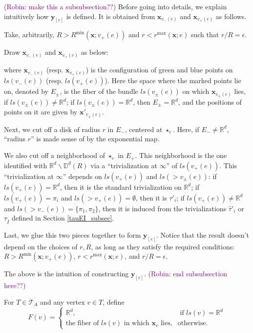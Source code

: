 \documentclass[11pt]{article}
\theoremstyle{definition}
\theoremstyle{remark}
\def\R{\mathbb{R}}
\def\D{\mathbb{D}}
\def\rI{{\mathring{I}}}
\def\bx{\mathbf{x}}
\def\by{\mathbf{y}}
\def\cmt#1{\textcolor{purple}{(#1)}}
\begin{document}
\cmt{Robin: make this a subsubsection??}
Before going into details, we explain intuitively how $\by_{[e]}$ is defined. It is obtained from $\bx_{v_-(e)}$ and $\bx_{v_+(e)}$ as follows.

Take, arbitrarily, $R>R^{\min}(\bx;v_+(e))$ and $r<r^{\max}(\bx;e)$ such that $r/R=\epsilon$. 

Draw $\bx_{v_-(e)}$ and $\bx_{v_+(e)}$ as below: 


where $\bx_{v_-(e)}$ (resp. $\bx_{v_+(e)}$) is the configuration of green and blue points on $ls(v_-(e))$ (resp. $ls(v_+(e))$). 
Here the space where the marked points lie on, denoted by $E_\pm$, is the fiber of the bundle $ls(v_\pm(e))$ on which $\bx_{v_\pm(e)}$ lies, if $ls(v_\pm(e))\neq\R^d$; if $ls(v_{\pm}(e))=\R^d$, then $E_\pm=\R^d$, and the positions of points on it are given by $\bx'_{v_\pm(e)}$. 

Next, we cut off a disk of radius $r$ in $E_-$, centered at $\star_e$. Here, if $E_-\neq\R^d$, ``radius $r$'' is made sense of by the exponential map. 

We also cut off a neighborhood of $\star_e$ in $E_+$. This neighborhood is the one identified with $\R^d\backslash\D^d(R)$ via a ``trivialization at $\infty$'' of $ls(v_+(e))$. This ``trivialization at $\infty$'' depends on $ls(v_+(e))$ and $ls(>v_\pm(e))$: if $ls(v_+(e))=\R^d$, then it is the standard trivialization on $\R^d$; if $ls(v_+(e))=\pi_i$ and $ls(>v_+(e))=\emptyset$, then it is $\tau'_i$; if $ls(v_+(e))\neq\R^d$ and $ls(>v_-(e))=\{\pi_1,\pi_2\}$, then it is induced from the trivializations $\hat\tau'_i$ or $\tau_\rI$ defined in Section \ref{tauEI_subsec}. 


Last, we glue this two pieces together to form $\by_{[e]}$. Notice that the result doesn't depend on the choices of $r,R$, as long as they satisfy the required conditions:
$R>R^{\min}(\bx;v_+(e))$, $r<r^{\max}(\bx;e)$, and $r/R=\epsilon$. 



The above is the intuition of constructing $\by_{[e]}$. 
\cmt{Robin: end subsubsection here??}

For $T \in \mathcal{T}_A$ and any vertex $v \in T$, define 
\[
F(v) = 
\left\{
\begin{array}{ll}
\R^d, & \text{ if } ls(v)=\R^d \\
\text{the fiber of $ls(v)$ in which $\bx_v$ lies,} & \text{otherwise.}
\end{array}
\right.
\] 
\end{document}
